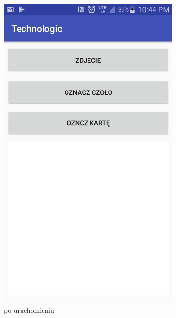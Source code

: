 \documentclass{article}
\numberwithin{equation}{section}
\begin{document}
\begin{figure}[H]
    \centering
        \begin{subfigure}{0.25\textwidth}
        \centering
        \includegraphics[width=\linewidth]{puste.png}
        \caption{po uruchomieniu}
        \label{fig:pustaAktywnosc}
    \end{subfigure}\hfill
    \begin{subfigure}{0.25\textwidth}
        \centering

\end{subfigure}
\end{figure}
\end{document}
